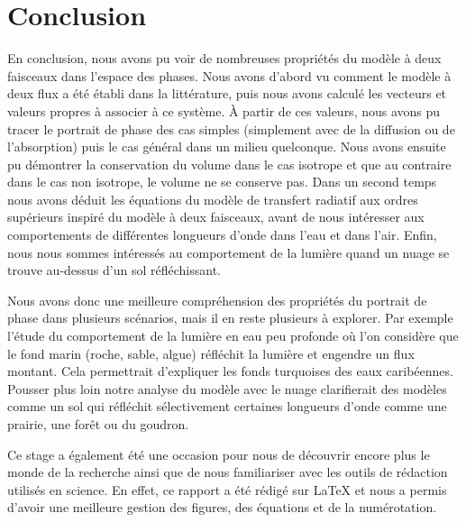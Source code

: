 \documentclass[12pt]{article}
\begin{document}

\section{Conclusion}
En conclusion, nous avons pu voir de nombreuses propriétés du modèle à deux faisceaux dans l'espace des phases. Nous avons d'abord vu comment le modèle à deux flux a été établi dans la littérature, puis nous avons calculé les vecteurs et valeurs propres à associer à ce système. À partir de ces valeurs, nous avons pu tracer le portrait de phase des cas simples (simplement avec de la diffusion ou de l'absorption) puis le cas général dans un milieu quelconque. Nous avons ensuite pu démontrer la conservation du volume dans le cas isotrope et que au contraire dans le cas non isotrope, le volume ne se conserve pas. Dans un second temps nous avons déduit les équations du modèle de transfert radiatif aux ordres supérieurs inspiré du modèle à deux faisceaux, avant de nous intéresser aux comportements de différentes longueurs d'onde dans l'eau et dans l'air. Enfin, nous nous sommes intéressés au comportement de la lumière quand un nuage se trouve au-dessus d'un sol réfléchissant.

Nous avons donc une meilleure compréhension des propriétés du portrait de phase dans plusieurs scénarios, mais il en reste plusieurs à explorer. Par exemple l'étude du comportement de la lumière en eau peu profonde où l'on considère que le fond marin (roche, sable, algue) réfléchit la lumière et engendre un flux montant. Cela permettrait d'expliquer les fonds turquoises des eaux caribéennes. Pousser plus loin notre analyse du modèle avec le nuage clarifierait des modèles comme un sol qui réfléchit sélectivement certaines longueurs d'onde comme une prairie, une forêt ou du goudron.

Ce stage a également été une occasion pour nous de découvrir encore plus le monde de la recherche ainsi que de nous familiariser avec les outils de rédaction utilisés en science. En effet, ce rapport a été rédigé sur LaTeX et nous a permis d'avoir une meilleure gestion des figures, des équations et de la numérotation. 


\end{document}
